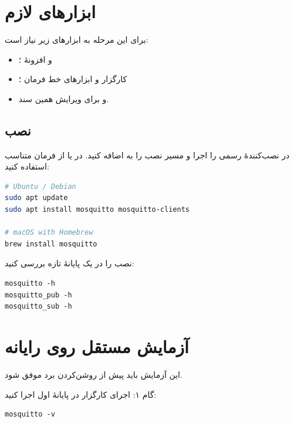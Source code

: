 \section{ابزارهای لازم}
برای این مرحله به ابزارهای زیر نیاز است:

\begin{itemize}
  \item
  و افزونهٔ
  ؛
  \item کارگزار و ابزارهای خط فرمان
  ؛
  \item
  و
  برای ویرایش همین سند.
\end{itemize}

\subsection{نصب
}
در
نصب‌کنندهٔ رسمی
را اجرا و مسیر نصب را به
اضافه کنید. در
یا
از فرمان متناسب استفاده کنید:

\begin{LTR}
\begin{lstlisting}[language=bash]
# Ubuntu / Debian
sudo apt update
sudo apt install mosquitto mosquitto-clients

# macOS with Homebrew
brew install mosquitto
\end{lstlisting}
\end{LTR}

نصب را در یک پایانهٔ تازه بررسی کنید:

\begin{LTR}
\begin{lstlisting}
mosquitto -h
mosquitto_pub -h
mosquitto_sub -h
\end{lstlisting}
\end{LTR}

\section{آزمایش مستقل روی رایانه}
این آزمایش باید پیش از روشن‌کردن برد موفق شود.

\begin{stepbox}{گام ۱: اجرای کارگزار}
در پایانهٔ اول اجرا کنید:

\begin{LTR}
\begin{lstlisting}
mosquitto -v
\end{lstlisting}
\end{LTR}
\end{stepbox}

